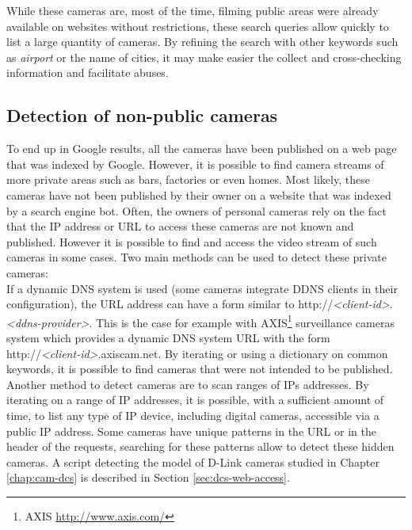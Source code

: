 While these cameras are, most of the time, filming public areas were already available on websites without restrictions, these search queries allow quickly to list a large quantity of cameras.
By refining the search with other keywords such as \emph{airport} or the name of cities, it may make easier the collect and cross-checking information and facilitate abuses.\\

\subsection{Detection of non-public cameras}
\label{sec:cam-detection-hidden}

To end up in Google results, all the cameras have been published on a web page that was indexed by Google.
However, it is possible to find camera streams of more private areas such as bars, factories or even homes.
Most likely, these cameras have not been published by their owner on a website that was indexed by a search engine bot.
Often, the owners of personal cameras rely on the fact that the IP address or URL to access these cameras are not known and published.
However it is possible to find and access the video stream of such cameras in some cases.
Two main methods can be used to detect these private cameras:\\

If a dynamic DNS system is used (some cameras integrate DDNS clients in their configuration), the URL address can have a form similar to http://\emph{\textless client-id\textgreater}.\emph{\textless ddns-provider\textgreater}.
This is the case for example with AXIS\footnote{AXIS \url{http://www.axis.com/}} surveillance cameras system which provides a dynamic DNS system URL with the form http://\emph{\textless client-id\textgreater}.axiscam.net.
By iterating or using a dictionary on common keywords, it is possible to find cameras that were not intended to be published.\\

Another method to detect cameras are to scan ranges of IPs addresses.
By iterating on a range of IP addresses, it is possible, with a sufficient amount of time, to list any type of IP device, including digital cameras, accessible via a public IP address.
Some cameras have unique patterns in the URL or in the header of the requests, searching for these patterns allow to detect these hidden cameras.
A script detecting the model of D-Link cameras studied in Chapter \ref{chap:cam-dcs} is described in Section \ref{sec:dcs-web-access}.\\

